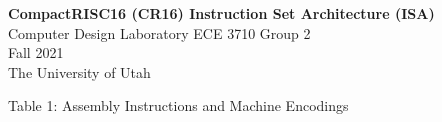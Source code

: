 \documentclass{article}
\begin{document}
\begin{center}
\LARGE{\textbf{CompactRISC16 (CR16) Instruction Set Architecture (ISA)}}\\[7pt]
\normalsize{Computer Design Laboratory ECE 3710 Group 2}\\
\normalsize{Fall 2021}\\
\normalsize{The University of Utah}
\end{center}

\large{Table 1: Assembly Instructions and Machine Encodings}
\centering
\footnotesize
\renewcommand{\arraystretch}{1.4}
\end{document}
